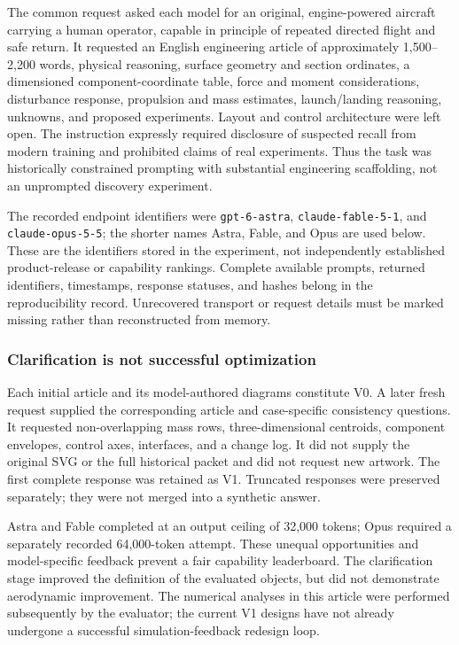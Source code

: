 \documentclass[10pt,letterpaper]{article}
\begin{document}
The common request asked each model for an original, engine-powered aircraft carrying a human operator, capable in principle of repeated directed flight and safe return. It requested an English engineering article of approximately 1,500--2,200 words, physical reasoning, surface geometry and section ordinates, a dimensioned component-coordinate table, force and moment considerations, disturbance response, propulsion and mass estimates, launch/landing reasoning, unknowns, and proposed experiments. Layout and control architecture were left open. The instruction expressly required disclosure of suspected recall from modern training and prohibited claims of real experiments. Thus the task was historically constrained prompting with substantial engineering scaffolding, not an unprompted discovery experiment.

The recorded endpoint identifiers were \texttt{gpt-6-astra}, \texttt{claude-fable-5-1}, and \texttt{claude-opus-5-5}; the shorter names Astra, Fable, and Opus are used below. These are the identifiers stored in the experiment, not independently established product-release or capability rankings. Complete available prompts, returned identifiers, timestamps, response statuses, and hashes belong in the reproducibility record. Unrecovered transport or request details must be marked missing rather than reconstructed from memory.

\subsubsection{Clarification is not successful optimization}
Each initial article and its model-authored diagrams constitute V0. A later fresh request supplied the corresponding article and case-specific consistency questions. It requested non-overlapping mass rows, three-dimensional centroids, component envelopes, control axes, interfaces, and a change log. It did not supply the original SVG or the full historical packet and did not request new artwork. The first complete response was retained as V1. Truncated responses were preserved separately; they were not merged into a synthetic answer.

Astra and Fable completed at an output ceiling of 32,000 tokens; Opus required a separately recorded 64,000-token attempt. These unequal opportunities and model-specific feedback prevent a fair capability leaderboard. The clarification stage improved the definition of the evaluated objects, but did not demonstrate aerodynamic improvement. The numerical analyses in this article were performed subsequently by the evaluator; the current V1 designs have not already undergone a successful simulation-feedback redesign loop.
\end{document}
